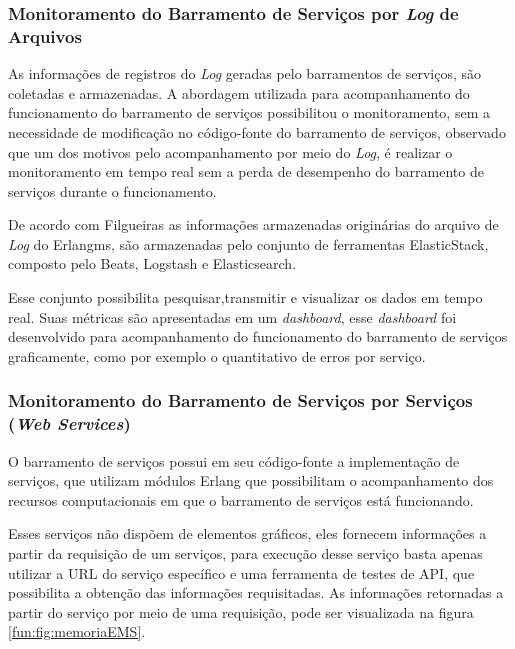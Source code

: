 \subsubsection{Monitoramento do Barramento de Serviços por \textit{Log} de Arquivos}

As informações de registros do \textit{Log} geradas pelo barramentos de serviços, são coletadas e armazenadas. A abordagem utilizada para acompanhamento do funcionamento do barramento de serviços possibilitou o monitoramento, sem a necessidade de modificação no código-fonte do barramento de serviços, observado que um dos motivos pelo acompanhamento por meio do \textit{Log}, é realizar o monitoramento em tempo real sem a perda de desempenho  do barramento de serviços durante o funcionamento. 

De acordo com Filgueiras\cite{filgueirasmonitoramento}  as informações armazenadas originárias do arquivo de \textit{Log} do Erlangms, são armazenadas pelo conjunto de ferramentas ElasticStack, composto pelo Beats, Logstash e Elasticsearch. 

Esse conjunto possibilita pesquisar,transmitir e visualizar os dados em tempo real\cite{filgueirasmonitoramento}. Suas métricas são apresentadas em um \textit{dashboard}, esse \textit{dashboard} foi desenvolvido para acompanhamento do funcionamento do barramento de serviços graficamente, como por exemplo o quantitativo de erros por serviço.



\subsubsection{Monitoramento do Barramento de Serviços por Serviços (\textit{Web Services})}
O barramento de serviços possui em seu código-fonte a implementação de serviços, que utilizam módulos Erlang que possibilitam o acompanhamento dos recursos computacionais em que o barramento de serviços está funcionando. 

Esses serviços não dispõem de elementos gráficos, eles fornecem informações a partir da requisição de um serviços, para execução desse serviço basta apenas utilizar a \acrshort{URL} do serviço específico e uma ferramenta de testes de \acrshort{API}, que possibilita a obtenção das informações requisitadas. 
As informações retornadas a partir do serviço por meio de uma requisição, pode ser visualizada na figura \ref{fun:fig:memoriaEMS}.

